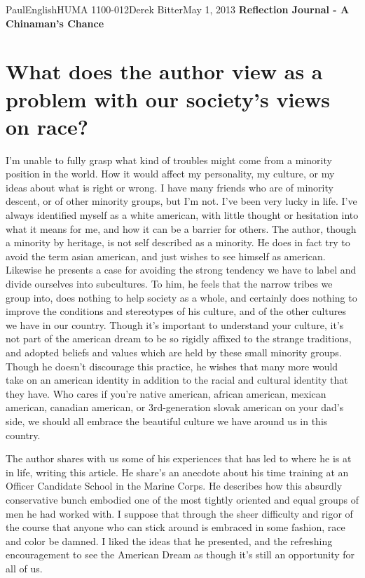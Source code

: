 \documentclass[12pt,letterpaper]{article}
\begin{document}
\begin{mla}{Paul}{English}{HUMA 1100-012}{Derek
    Bitter}{May 1, 2013}    
    {\textbf{Reflection Journal - A Chinaman's Chance}}

\section*{What does the author view as a problem with our society's views on race?}

I'm unable to fully grasp what kind of troubles might come from a minority position in the world. How it would affect my personality, my culture, or my ideas about what is right or wrong. I have many friends who are of minority descent, or of other minority groups, but I'm not. I've been very lucky in life. I've always identified myself as a white american, with little thought or hesitation into what it means for me, and how it can be a barrier for others. The author, though a minority by heritage, is not self described as a minority. He does in fact try to avoid the term asian american, and just wishes to see himself as american. Likewise he presents a case for avoiding the strong tendency we have to label and divide ourselves into subcultures. To him, he feels that the narrow tribes we group into, does nothing to help society as a whole, and certainly does nothing to improve the conditions and stereotypes of his culture, and of the other cultures we have in our country. Though it's important to understand your culture, it's not part of the american dream to be so rigidly affixed to the strange traditions, and adopted beliefs and values which are held by these small minority groups. Though he doesn't discourage this practice, he wishes that many more would take on an american identity in addition to the racial and cultural identity that they have. Who cares if you're native american, african american, mexican american, canadian american, or 3rd-generation slovak american on your dad's side, we should all embrace the beautiful culture we have around us in this country.

The author shares with us some of his experiences that has led to where he is at in life, writing this article. He share's an anecdote about his time training at an Officer Candidate School in the Marine Corps. He describes how this absurdly conservative bunch embodied one of the most tightly oriented and equal groups of men he had worked with. I suppose that through the sheer difficulty and rigor of the course that anyone who can stick around is embraced in some fashion, race and color be damned. I liked the ideas that he presented, and the refreshing encouragement to see the American Dream as though it's still an opportunity for all of us.


\end{mla}
\end{document}
